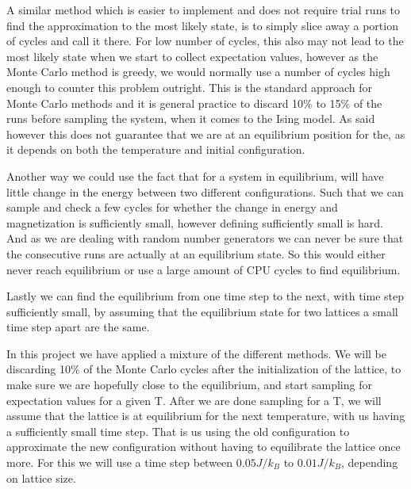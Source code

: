 \documentclass[%
reprint,
nofootinbib,
amsmath,amssymb,
aps,
]{revtex4-1}
\begin{document}
A similar method which is easier to implement and does not require trial runs to find the approximation to the most likely state, is to simply slice away a portion of cycles and call it there. For low number of cycles, this also may not lead to the most likely state when we start to collect expectation values, however as the Monte Carlo method is greedy, we would normally use a number of cycles high enough to counter this problem outright. This is the standard approach for Monte Carlo methods and it is general practice to discard 10$\%$ to 15$\%$ of the runs before sampling the system, when it comes to the Ising model. As said however this does not guarantee that we are at an equilibrium position for the, as it depends on both the temperature and initial configuration. 

Another way we could use the fact that for a system in equilibrium, will have little change in the energy between two different configurations. Such that we can sample and check a few cycles for whether the change in energy and magnetization is sufficiently small, however defining sufficiently small is hard. And as we are dealing with random number generators we can never be sure that the consecutive runs are actually at an equilibrium state. So this would either never reach equilibrium or use a large amount of CPU cycles to find equilibrium. 

Lastly we can find the equilibrium from one time step to the next, with time step sufficiently small, by assuming that the equilibrium state for two lattices a small time step apart are the same. 

In this project we have applied a mixture of the different methods. We will be discarding 10$\%$ of the Monte Carlo cycles after the initialization of the lattice, to make sure we are hopefully close to the equilibrium, and start sampling for expectation values for a given T. After we are done sampling for a T, we will assume that the lattice is at equilibrium for the next temperature, with us having a sufficiently small time step. That is us using the old configuration to approximate the new configuration without having to equilibrate the lattice once more. For this we will use a time step between $0.05J/k_B$ to $0.01J/k_B$, depending on lattice size. 
\end{document}
